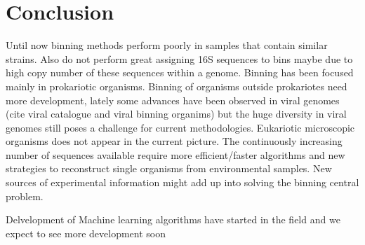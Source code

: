 \documentclass{article}
\begin{document}
\section{Conclusion}
Until now binning methods perform poorly in samples that contain similar strains. Also do not perform great assigning 16S sequences to bins maybe due to high copy number of these sequences within a genome.
Binning has been focused mainly in prokariotic organisms. Binning of organisms outside prokariotes need more development, lately some advances have been observed in viral genomes  (cite viral catalogue and viral binning organims) but the huge diversity in viral genomes still poses a challenge for current methodologies. Eukariotic microscopic organisms does not appear in the current picture. 
The continuously increasing number of sequences available require more efficient/faster algorithms and new strategies to reconstruct single organisms from environmental samples.
New sources of experimental information might add up into solving the binning central problem.

Delvelopment of Machine learning algorithms have started in the field and we expect to see more development soon



\end{document}
